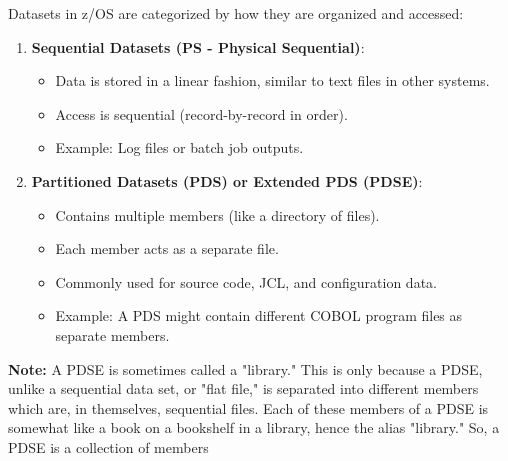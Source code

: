 \documentclass{report}
\begin{document}
\begin{itemize}
            \bigbreak \noindent 
            Datasets in z/OS are categorized by how they are organized and accessed:
            \begin{enumerate}
                \item \textbf{Sequential Datasets (PS - Physical Sequential)}:
                    \begin{itemize}
                        \item Data is stored in a linear fashion, similar to text files in other systems.
                        \item Access is sequential (record-by-record in order).
                        \item Example: Log files or batch job outputs.
                    \end{itemize}
                \item \textbf{Partitioned Datasets (PDS) or Extended PDS (PDSE)}:
                    \begin{itemize}
                        \item Contains multiple members (like a directory of files).
                        \item Each member acts as a separate file.
                        \item Commonly used for source code, JCL, and configuration data.
                        \item Example: A PDS might contain different COBOL program files as separate members.
                    \end{itemize}
            \end{enumerate}
            \bigbreak \noindent 
            \textbf{Note:} A PDSE is sometimes called a "library." This is only because a PDSE, unlike a sequential data set, or "flat file," is separated into different members which are, in themselves, sequential files. Each of these members of a PDSE is somewhat like a book on a bookshelf in a library, hence the alias "library." So, a PDSE is a collection of members
    \end{itemize}

    \pagebreak 
\end{document}
